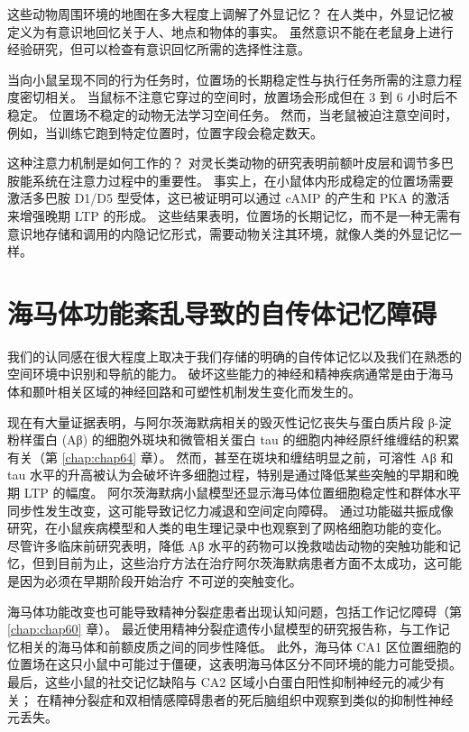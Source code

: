 这些动物周围环境的地图在多大程度上调解了外显记忆？ 在人类中，外显记忆被定义为有意识地回忆关于人、地点和物体的事实。
虽然意识不能在老鼠身上进行经验研究，但可以检查有意识回忆所需的选择性注意。


当向小鼠呈现不同的行为任务时，位置场的长期稳定性与执行任务所需的注意力程度密切相关。
当鼠标不注意它穿过的空间时，放置场会形成但在 3 到 6 小时后不稳定。
位置场不稳定的动物无法学习空间任务。
然而，当老鼠被迫注意空间时，例如，当训练它跑到特定位置时，位置字段会稳定数天。


这种注意力机制是如何工作的？
对灵长类动物的研究表明前额叶皮层和调节多巴胺能系统在注意力过程中的重要性。
事实上，在小鼠体内形成稳定的位置场需要激活多巴胺 D1/D5 型受体，这已被证明可以通过 cAMP 的产生和 PKA 的激活来增强晚期 LTP 的形成。
这些结果表明，位置场的长期记忆，而不是一种无需有意识地存储和调用的内隐记忆形式，需要动物关注其环境，就像人类的外显记忆一样。



\section{海马体功能紊乱导致的自传体记忆障碍}

我们的认同感在很大程度上取决于我们存储的明确的自传体记忆以及我们在熟悉的空间环境中识别和导航的能力。
破坏这些能力的神经和精神疾病通常是由于海马体和颞叶相关区域的神经回路和可塑性机制发生变化而发生的。


现在有大量证据表明，与阿尔茨海默病相关的毁灭性记忆丧失与蛋白质片段 β-淀粉样蛋白 (Aβ) 的细胞外斑块和微管相关蛋白 tau 的细胞内神经原纤维缠结的积累有关（第 \ref{chap:chap64} 章）。
然而，甚至在斑块和缠结明显之前，可溶性 Aβ 和 tau 水平的升高被认为会破坏许多细胞过程，特别是通过降低某些突触的早期和晚期 LTP 的幅度。
阿尔茨海默病小鼠模型还显示海马体位置细胞稳定性和群体水平同步性发生改变，这可能导致记忆力减退和空间定向障碍。
通过功能磁共振成像研究，在小鼠疾病模型和人类的电生理记录中也观察到了网格细胞功能的变化。
尽管许多临床前研究表明，降低 Aβ 水平的药物可以挽救啮齿动物的突触功能和记忆，但到目前为止，这些治疗方法在治疗阿尔茨海默病患者方面不太成功，这可能是因为必须在早期阶段开始治疗 不可逆的突触变化。


海马体功能改变也可能导致精神分裂症患者出现认知问题，包括工作记忆障碍（第 \ref{chap:chap60} 章）。
最近使用精神分裂症遗传小鼠模型的研究报告称，与工作记忆相关的海马体和前额皮质之间的同步性降低。
此外，海马体 CA1 区位置细胞的位置场在这只小鼠中可能过于僵硬，这表明海马体区分不同环境的能力可能受损。
最后，这些小鼠的社交记忆缺陷与 CA2 区域小白蛋白阳性抑制神经元的减少有关；
在精神分裂症和双相情感障碍患者的死后脑组织中观察到类似的抑制性神经元丢失。


